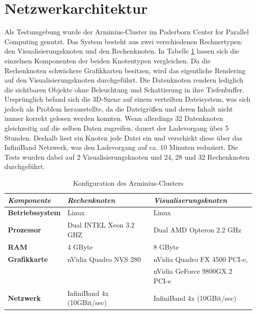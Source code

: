 \section{Netzwerkarchitektur}
\label{sec:impl:netzwerkarchitektur}
Als Testumgebung wurde der Arminius-Cluster im Paderborn Center for Parallel Computing \cite{pc2} genutzt. Das System besteht aus zwei verschiedenen Rechnertypen: den Visualisierungsknoten und den Rechenknoten. In Tabelle \ref{tab:impl:arminius} lassen sich die einzelnen Komponenten der beiden Knotentypen vergleichen. Da die Rechenknoten schwächere Grafikkarten besitzen, wird das eigentliche Rendering auf den Visualisierungsknoten durchgeführt. Die Datenknoten rendern lediglich die sichtbaren Objekte ohne Beleuchtung und Schattierung in ihre Tiefenbuffer.\\
Ursprünglich befand sich die 3D-Szene auf einem verteilten Dateisystem, was sich jedoch als Problem herausstellte, da die Dateigrößen und deren Inhalt nicht immer korrekt gelesen werden konnten. Wenn allerdings 32 Datenknoten gleichzeitig auf die selben Daten zugreifen, dauert der Ladevorgang über 5 Stunden. Deshalb liest ein Knoten jede Datei ein und verschickt diese über das InfiniBand Netzwerk, was den Ladevorgang auf ca. 10 Minuten reduziert. Die Tests wurden dabei auf 2 Visualisierungsknoten und 24, 28 und 32 Rechenknoten durchgeführt.

\begin{table}
 \centering
 \begin{tabular}{lll} %
  \toprule %
  \textit{Komponente} & \textit{Rechenknoten} & \textit{Visualiserungsknoten} \\
  \midrule
  \textbf{Betriebssystem} & Linux & Linux \\
  \textbf{Prozessor} & Dual INTEL Xeon 3.2 GHZ & Dual AMD Opteron 2.2 GHz \\
  \textbf{RAM} & 4 GByte & 8 GByte \\
  \textbf{Grafikkarte} & nVidia Quadro NVS 280 & nVidia Quadro FX 4500 PCI-e, \\
  \;&\;& nVidia GeForce 9800GX 2 PCI-e \\
  \textbf{Netzwerk} & InfiniBand 4x (10GBit/sec) & InfiniBand 4x (10GBit/sec) \\
  \bottomrule
 \end{tabular} 
 \caption{Konfiguration des Arminius-Clusters}
 \label{tab:impl:arminius}
\end{table}

